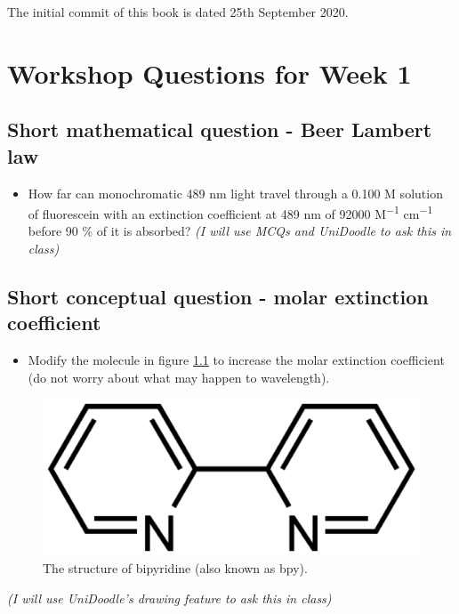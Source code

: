 \documentclass[
]{book}
\providecommand{\tightlist}{%
  \setlength{\itemsep}{0pt}\setlength{\parskip}{0pt}}
\begin{document}
The initial commit of this book is dated 25th September 2020.

\hypertarget{ch:Workshop1}{%
\chapter{Workshop Questions for Week 1}\label{ch:Workshop1}}

\hypertarget{sec:BeerLambert}{%
\section{Short mathematical question - Beer Lambert law}\label{sec:BeerLambert}}

\begin{itemize}
\tightlist
\item
  How far can monochromatic 489 nm light travel through a 0.100 M solution of fluorescein with an extinction coefficient at 489 nm of 92000 M\textsuperscript{−1} cm\textsuperscript{−1} before 90 \% of it is absorbed?
  \emph{(I will use MCQs and UniDoodle to ask this in class)}
\end{itemize}

\hypertarget{sec:MolarExtinction}{%
\section{Short conceptual question - molar extinction coefficient}\label{sec:MolarExtinction}}

\begin{itemize}
\tightlist
\item
  Modify the molecule in figure \ref{fig:bpy} to increase the molar extinction coefficient (do not worry about what may happen to wavelength).
\end{itemize}

\begin{figure}

{\centering \includegraphics[width=0.3\linewidth]{images/bpy} 

}

\caption{The structure of bipyridine (also known as bpy).}\label{fig:bpy}
\end{figure}

\emph{(I will use UniDoodle's drawing feature to ask this in class)}
\end{document}
